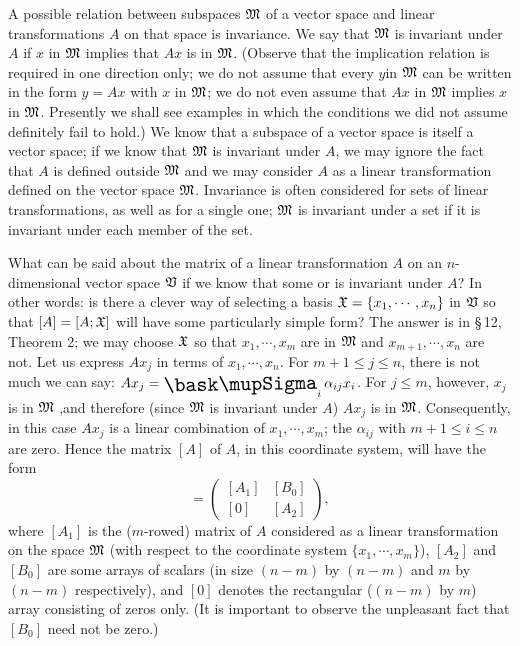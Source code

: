 A possible relation between subspaces \(\frak{M}\) of a vector space and linear
transformations \(A\) on that space is invariance. We say that \(\frak{M}\) is
invariant under \(A\) if \(x\) in \(\frak{M}\) implies that \(Ax\) is in
\(\frak{M}\). (Observe that the implication relation is required in one
direction only; we do not assume that every \(y\)in \(\frak{M}\) can be written
in the form \(y = Ax\) with \(x\) in \(\frak{M}\); we do not even assume that
\(Ax\) in \(\frak{M}\) implies \(x\) in \(\frak{M}\). Presently we shall see
examples in which the conditions we did not assume definitely fail to hold.) We
know that a subspace of a vector space is itself a vector space; if we know that
\(\frak{M}\) is invariant under \(A\), we may ignore the fact that \(A\) is
defined outside \(\frak{M}\) and we may consider \(A\) as a linear
transformation defined on the vector space \(\frak{M}\). Invariance is often
considered for sets of linear transformations, as well as for a single one;
\(\frak{M}\) is invariant under a set if it is invariant under each member of
the set.

What can be said about the matrix of a linear transformation \(A\) on an
\(n\)-dimensional vector space \(\frak{V}\) if we know that some or is invariant
under \(A\)? In other words: is there a clever way of selecting a basis
\(\frak{X} = \{x_1, \cdots, x_n\}\) in \(\frak{V}\) so that \([A] = [A;
\frak{X}]\) will have some particularly simple form? The answer is in \S\,12,
Theorem 2; we may choose \(\frak{X}\) so that \(x_1, \cdots, x_m\) are in
\(\frak{M}\) and \(x_{m+1}, \cdots, x_n\) are not. Let us express \(Ax_j\) in
terms of \(x_1, \cdots, x_n\). For \(m + 1 \leq j \leq n\), there is not much we
can say: \(Ax_j = \sumx_i \alpha_{ij} x_i\). For \(j \leq m\), however, \(x_j\)
is in \(\frak{M}\) ,and therefore (since \(\frak{M}\) is invariant under \(A\))
\(Ax_j\) is in \(\frak{M}\). Consequently, in this case \(Ax_j\) is a linear
combination of \(x_1, \cdots, x_m\); the \(\alpha_{ij}\) with \(m + 1 \leq i
\leq n\) are zero. Hence the matrix \([A]\) of \(A\), in this coordinate system,
will have the form
\begin{equation*}
    [A] = \begin{pmatrix}
        [A_1] & [B_0] \\
        [0] & [A_2]
    \end{pmatrix},
\end{equation*}
where \([A_1]\) is the (\(m\)-rowed) matrix of \(A\) considered as a linear
transformation on the space \(\frak{M}\) (with respect to the coordinate system
\(\{x_1, \cdots, x_m\}\)), \([A_2]\) and \([B_0]\) are some arrays of scalars
(in size \((n - m)\) by \((n- m)\) and \(m\) by \((n - m)\) respectively), and
\([0]\) denotes the rectangular (\((n - m)\) by \(m\)) array consisting of zeros
only. (It is important to observe the unpleasant fact that \([B_0]\) need not be
zero.)

